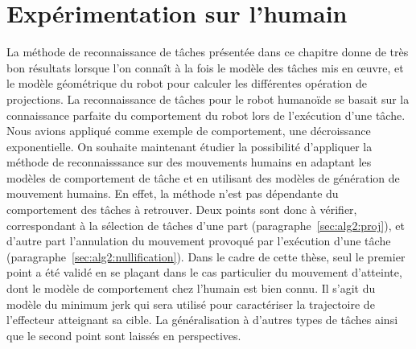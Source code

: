 \section{Exp\'erimentation sur l'humain}
\label{chap:xpHumain}
La méthode de reconnaissance de t\^aches présentée dans ce chapitre donne
de très bon résultats lorsque l'on connaît à la fois le modèle
des t\^aches mis en \oe uvre, et le modèle géométrique 
du robot pour calculer les différentes opération de projections. 
La reconnaissance de t\^aches pour le robot humanoïde se basait sur la connaissance
parfaite du comportement du robot lors de l'exécution d'une t\^ache.
Nous avions appliqué comme exemple de comportement, une décroissance exponentielle.
On souhaite maintenant étudier la possibilité
d'appliquer la méthode de reconnaisssance sur des mouvements humains en
adaptant les modèles de comportement de t\^ache et en utilisant 
des modèles de génération de mouvement humains.
En effet, la méthode n'est pas 
dépendante du comportement des t\^aches à retrouver.
Deux points sont donc à vérifier, correspondant
à la sélection de t\^aches d'une part (paragraphe~\ref{sec:alg2:proj}),
et d'autre part l'annulation du mouvement provoqué par l'exécution
d'une t\^ache (paragraphe~\ref{sec:alg2:nullification}).
Dans le cadre de cette thèse, seul le premier point 
a été validé en se plaçant dans le cas particulier du 
mouvement d'atteinte, dont le modèle de comportement chez l'humain 
est bien connu. 
Il s'agit du modèle du minimum jerk qui sera utilisé pour caractériser 
la trajectoire de l'effecteur atteignant sa cible.
La généralisation à d'autres types de t\^aches
ainsi que le second point
sont laissés en perspectives.

